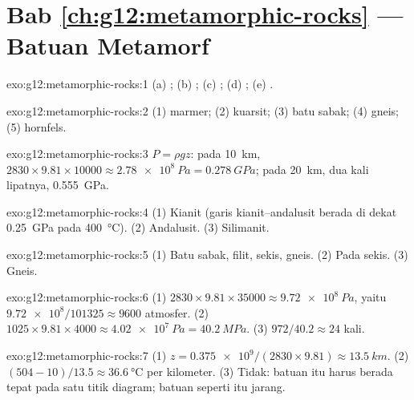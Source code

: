 \section*{Bab \ref{ch:g12:metamorphic-rocks} --- Batuan Metamorf}

\begin{solution}{exo:g12:metamorphic-rocks:1}
(a) ; (b) ; (c) ; (d) ; (e) .
\end{solution}

\begin{solution}{exo:g12:metamorphic-rocks:2}
(1) marmer; (2) kuarsit; (3) batu sabak; (4) gneis; (5) hornfels.
\end{solution}

\begin{solution}{exo:g12:metamorphic-rocks:3}
$P = \rho g z$: pada \qty{10}{km}, $2830 \times 9.81 \times \num{10000} \approx
\qty{2.78e8}{Pa} = \qty{0.278}{GPa}$; pada \qty{20}{km}, dua kali lipatnya,
\qty{0.555}{GPa}.
\end{solution}

\begin{solution}{exo:g12:metamorphic-rocks:4}
(1) Kianit (garis kianit--andalusit berada di dekat \qty{0.25}{GPa} pada
\qty{400}{\celsius}). (2) Andalusit. (3) Silimanit.
\end{solution}

\begin{solution}{exo:g12:metamorphic-rocks:5}
(1) Batu sabak, filit, sekis, gneis. (2) Pada sekis. (3) Gneis.
\end{solution}

\begin{solution}{exo:g12:metamorphic-rocks:6}
(1) $2830 \times 9.81 \times \num{35000} \approx \qty{9.72e8}{Pa}$, yaitu
$\num{9.72e8}/101325 \approx \num{9600}$ atmosfer. (2) $1025 \times 9.81
\times 4000 \approx \qty{4.02e7}{Pa} = \qty{40.2}{MPa}$. (3) $972/40.2
\approx 24$ kali.
\end{solution}

\begin{solution}{exo:g12:metamorphic-rocks:7}
(1) $z = \num{0.375e9}/(2830 \times 9.81) \approx \qty{13.5}{km}$.
(2) $(504 - 10)/13.5 \approx \qty{36.6}{\celsius}$ per kilometer. (3) Tidak:
batuan itu harus berada tepat pada satu titik diagram; batuan seperti itu
jarang.
\end{solution}

